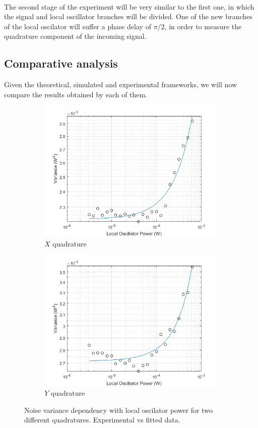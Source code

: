 \\
The second stage of the experiment will be very similar to the first one, in which the signal and local oscillator branches will be divided. One of the new branches of the local oscilator will suffer a phase delay of $\pi/2$, in order to measure the quadrature component of the incoming signal.\\

\subsection{Comparative analysis}
%
%
Given the theoretical, simulated and experimental frameworks, we will now compare the results obtained by each of them.
\\
%
\begin{figure}[H]
	\begin{subfigure}{.5\textwidth}
		\centering
		\includegraphics[width=.8\linewidth]{./sdf/optical_detection/figures/noise_exp_channel1.png}
		\caption{$X$ quadrature}
		\label{fig:noise-exp-1}
	\end{subfigure}%
	\begin{subfigure}{.5\textwidth}
		\centering
		\includegraphics[width=.8\linewidth]{./sdf/optical_detection/figures/noise_exp_channel3.png}
		\caption{$Y$ quadrature}
		\label{fig:noise-exp-3}
	\end{subfigure}
	\captionsetup{justification=centering}
	\caption{Noise variance dependency with local oscilator power for two different quadratures. Experimental vs fitted data.}
\end{figure}
